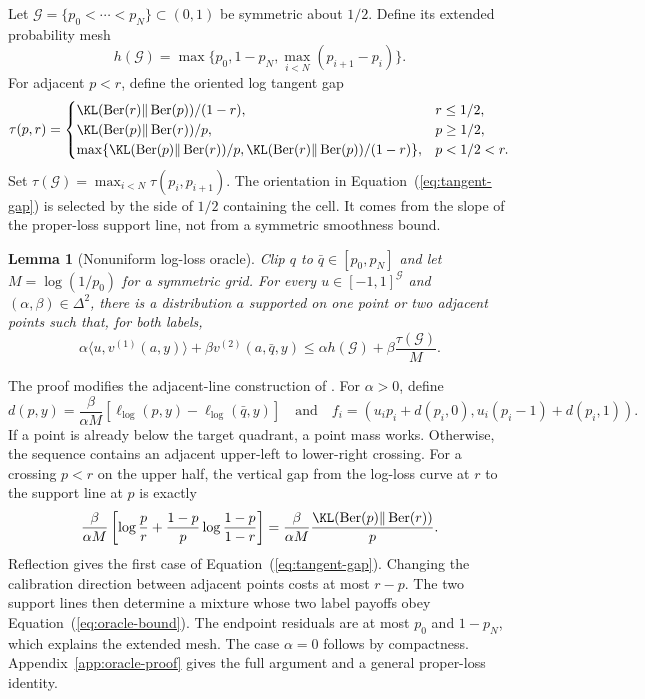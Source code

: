 \documentclass{article}
\newtheorem{lemma}{Lemma}
\newcommand{\Ber}{\operatorname{Ber}}
\newcommand{\simplex}{\Delta}
\begin{document}
Let $\mathcal G=\{p_0<\cdots<p_N\}\subset(0,1)$ be symmetric about $1/2$. Define its extended probability mesh
\begin{equation}
 h(\mathcal G)=\max\{p_0,1-p_N,\max_{i<N}(p_{i+1}-p_i)\}.
 \label{eq:mesh}
\end{equation}
For adjacent $p<r$, define the oriented log tangent gap
\begin{equation}
 \tau(p,r)=
 \begin{cases}
 \KL(\Ber(r)\Vert\Ber(p))/(1-r),&r\leq1/2,\\
 \KL(\Ber(p)\Vert\Ber(r))/p,&p\geq1/2,\\
 \max\{\KL(\Ber(p)\Vert\Ber(r))/p,
 \KL(\Ber(r)\Vert\Ber(p))/(1-r)\},&p<1/2<r.
 \end{cases}
 \label{eq:tangent-gap}
\end{equation}
Set $\tau(\mathcal G)=\max_{i<N}\tau(p_i,p_{i+1})$. The orientation in Equation~(\ref{eq:tangent-gap}) is selected by the side of $1/2$ containing the cell. It comes from the slope of the proper-loss support line, not from a symmetric smoothness bound.

\begin{lemma}[Nonuniform log-loss oracle]
\label{lem:oracle}
Clip $q$ to $\bar q\in[p_0,p_N]$ and let $M=\log(1/p_0)$ for a symmetric grid. For every $u\in[-1,1]^{\mathcal G}$ and $(\alpha,\beta)\in\simplex^2$, there is a distribution $a$ supported on one point or two adjacent points such that, for both labels,
\begin{equation}
 \alpha\langle u,v^{(1)}(a,y)\rangle+
 \beta v^{(2)}(a,\bar q,y)
 \leq \alpha h(\mathcal G)+
 \beta\frac{\tau(\mathcal G)}M.
 \label{eq:oracle-bound}
\end{equation}
\end{lemma}

The proof modifies the adjacent-line construction of \citet{okoroafor2024faster,hu2026optimal}. For $\alpha>0$, define
\begin{equation}
 d(p,y)=\frac{\beta}{\alpha M}
 [\ell_{\log}(p,y)-\ell_{\log}(\bar q,y)]
 \quad\text{and}\quad
 f_i=(u_i p_i+d(p_i,0),u_i(p_i-1)+d(p_i,1)).
 \label{eq:f-curve}
\end{equation}
If a point is already below the target quadrant, a point mass works. Otherwise, the sequence contains an adjacent upper-left to lower-right crossing. For a crossing $p<r$ on the upper half, the vertical gap from the log-loss curve at $r$ to the support line at $p$ is exactly
\begin{equation}
 \frac{\beta}{\alpha M}
 \left[
 \log\frac p r+\frac{1-p}{p}\log\frac{1-p}{1-r}
 \right]
 =
 \frac{\beta}{\alpha M}
 \frac{\KL(\Ber(p)\Vert\Ber(r))}{p}.
 \label{eq:gap-identity}
\end{equation}
Reflection gives the first case of Equation~(\ref{eq:tangent-gap}). Changing the calibration direction between adjacent points costs at most $r-p$. The two support lines then determine a mixture whose two label payoffs obey Equation~(\ref{eq:oracle-bound}). The endpoint residuals are at most $p_0$ and $1-p_N$, which explains the extended mesh. The case $\alpha=0$ follows by compactness. Appendix~\ref{app:oracle-proof} gives the full argument and a general proper-loss identity.
\end{document}
